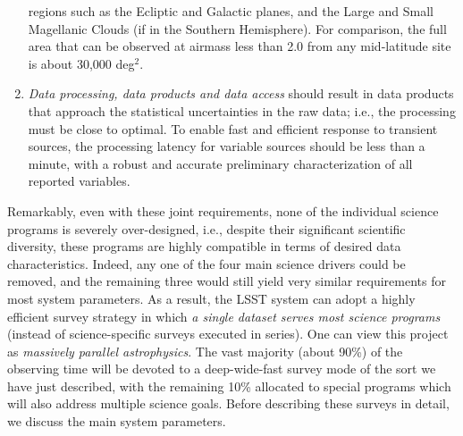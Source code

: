 \begin{enumerate}
   regions such as the Ecliptic and Galactic planes, and the Large and Small
   Magellanic Clouds (if in the Southern Hemisphere).  For comparison,
   the full area that can be observed at airmass less than 2.0 from
   any mid-latitude site is about 30,000 deg$^2$.
\item  \textit{Data processing, data products and data access} should
  result in data products that approach the statistical uncertainties
  in the raw data; i.e., the processing must be close to optimal.
To enable fast and efficient response to
   transient sources, the processing latency for variable sources should be less than a minute,
   with a robust and accurate preliminary characterization
   of all reported variables.
\end{enumerate}

Remarkably, even with these joint requirements, none of the
individual science programs is severely over-designed, i.e., despite
their significant scientific diversity, these programs are highly
compatible in terms of desired data characteristics. Indeed, any one
of the four main science drivers could be removed, and the remaining
three would still yield very similar requirements for most system
parameters. As a result, the LSST system can adopt a highly
efficient survey strategy in which \textit{a single dataset serves most science
programs} (instead of science-specific surveys executed in series).
One can view this project as \textit{massively parallel astrophysics}.
The vast majority (about 90\%) of the observing time will be devoted to
a deep-wide-fast survey mode of the sort we have just described, with
the remaining 10\%
allocated to special programs which will also address multiple science
goals. Before describing these surveys in detail, we discuss the main
system parameters.


